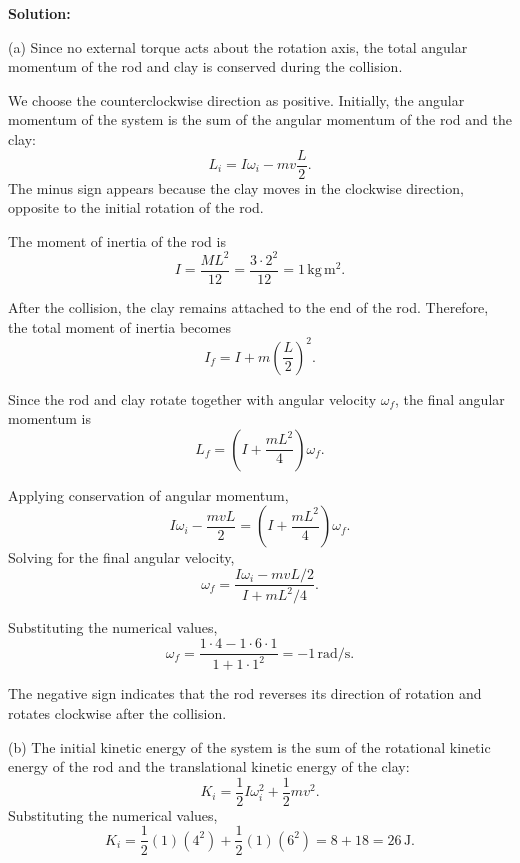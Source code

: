 \documentclass[../main.tex]{subfiles}
\begin{document}
\textbf{Solution:}

(a) Since no external torque acts about the rotation
axis, the total angular momentum of the rod and clay
is conserved during the collision.

We choose the counterclockwise direction as positive.
Initially, the angular momentum of the system is the
sum of the angular momentum of the rod and the clay:
\begin{equation}
    L_i = I\omega_i - mv\frac{L}{2}.
\end{equation}
The minus sign appears because the clay moves in the
clockwise direction, opposite to the initial rotation
of the rod.

The moment of inertia of the rod is
\begin{equation}
    I = \frac{ML^2}{12}
    = \frac{3\cdot 2^2}{12}
    = 1\,\mathrm{kg\,m^2}.
\end{equation}

After the collision, the clay remains attached to the
end of the rod. Therefore, the total moment of inertia
becomes
\begin{equation}
    I_f = I + m\left(\frac{L}{2}\right)^2.
\end{equation}

Since the rod and clay rotate together with angular
velocity $\omega_f$, the final angular momentum is
\begin{equation}
    L_f =
    \left(I+\frac{mL^2}{4}\right)\omega_f.
\end{equation}

Applying conservation of angular momentum,
\begin{equation}
    I\omega_i - \frac{mvL}{2}
    = \left(I+\frac{mL^2}{4}\right)\omega_f.
\end{equation}
Solving for the final angular velocity,
\begin{equation}
    \omega_f =
    \frac{I\omega_i-mvL/2}
    {I+mL^2/4}.
\end{equation}

Substituting the numerical values,
\begin{equation}
    \omega_f =
    \frac{1\cdot 4-1\cdot 6\cdot 1}
    {1+1\cdot 1^2}
    = \boxed{-1\,\mathrm{rad/s}}.
\end{equation}

The negative sign indicates that the rod reverses
its direction of rotation and rotates clockwise
after the collision.


(b) The initial kinetic energy of the system is the
sum of the rotational kinetic energy of the rod
and the translational kinetic energy of the clay:
\begin{equation}
    K_i = \frac{1}{2}I\omega_i^2
    +\frac{1}{2}mv^2.
\end{equation}
Substituting the numerical values,
\begin{equation}
    K_i = \frac{1}{2}(1)(4^2)
    +\frac{1}{2}(1)(6^2)
    = 8+18=26\,\mathrm{J}.
\end{equation}
\end{document}

